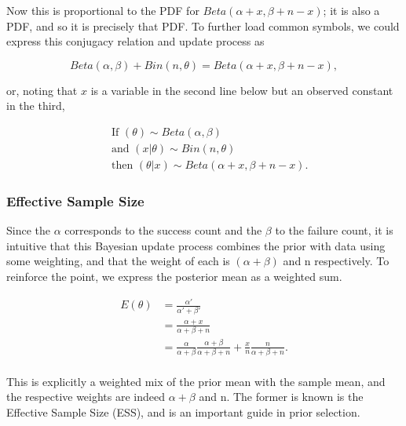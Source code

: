 \documentclass{article}
\begin{document}
Now this is proportional to the PDF for $Beta(\alpha+x, \beta+n-x)$; it is also a PDF, and so it is precisely that PDF. To further load common symbols, we could express this conjugacy relation and update process as

\begin{equation}
Beta(\alpha,\beta)+Bin(n,\theta)=Beta(\alpha+x, \beta+n-x),\label{update_process_BB}
\end{equation}
 
 or, noting that $x$ is a variable in the second line below but an observed constant in the third,
 
\begin{equation}
\begin{split}
    &\ \text{If } (\theta) \sim {Beta(\alpha,\beta)} \\
    &\ \text{and } (x|\theta) \sim Bin(n, \theta) \\
    &\ \text{then } (\theta|x) \sim Beta(\alpha+x,\beta+n-x). 
\end{split}
\end{equation}

\subsubsection{Effective Sample Size}
Since the $\alpha$ corresponds to the success count and the $\beta$ to the failure count, it is intuitive that this Bayesian update process combines the prior with data using some weighting, and that the weight of each is $(\alpha+\beta)$ and n respectively. To reinforce the point, we express the posterior mean as a weighted sum.

\begin{equation}
    \begin{split}
        E(\theta)
        &= \frac{\alpha'}{\alpha'+\beta'} \\
        &= \frac{\alpha+x}{\alpha+\beta+n} \\
        &= \frac{\alpha}{\alpha+\beta} \frac{\alpha+\beta}{\alpha+\beta+n}
        + \frac{x}{n} \frac{n}{\alpha+\beta+n}. \\ \label{ESS}
    \end{split}
\end{equation}

This is explicitly a weighted mix of the prior mean with the sample mean, and the respective weights are indeed $\alpha+\beta$ and n. The former is known is the Effective Sample Size (ESS), and is an important guide in prior selection.
\end{document}
